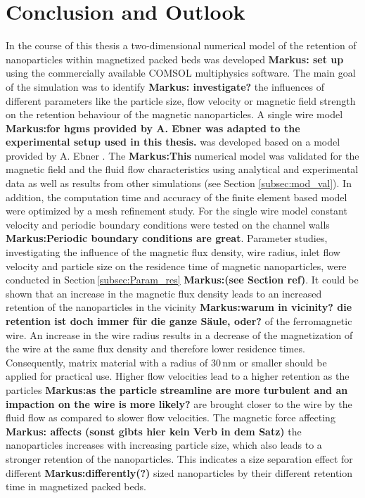 
\chapter{Conclusion and Outlook}
\label{ch:Conclusion}

In the course of this thesis a two-dimensional numerical model of the retention of nanoparticles within magnetized packed beds was developed \textbf{Markus: set up} using the commercially available COMSOL multiphysics software. The main goal of the simulation was to identify \textbf{Markus: investigate?} the influences of different parameters like the particle size, flow velocity or magnetic field strength on the retention behaviour of the magnetic nanoparticles. 
A single wire model \textbf{Markus:for hgms provided by A. Ebner was adapted to the experimental setup used in this thesis.} was developed based on a model provided by A. Ebner \cite{choomphon2017simulation}.  The \textbf{Markus:This} numerical model was validated for the magnetic field and the fluid flow characteristics using analytical and experimental data as well as results from other simulations (see Section \ref{subsec:mod_val}). In addition, the computation time and accuracy of the finite element based model were optimized by a mesh refinement study. For the single wire model constant velocity and periodic boundary conditions were tested on the channel walls \textbf{Markus:Periodic boundary conditions are great}. Parameter studies, investigating the influence of the magnetic flux density, wire radius, inlet flow velocity and particle size on the residence time of magnetic nanoparticles, were conducted in Section\,\ref{subsec:Param_res} \textbf{Markus:(see Section ref)}. It could be shown that an increase in the magnetic flux density leads to an increased retention of the nanoparticles in the vicinity \textbf{Markus:warum in vicinity? die retention ist doch immer für die ganze Säule, oder?} of the ferromagnetic wire. An increase in the wire radius results in a decrease of the magnetization of the wire at the same flux density and therefore lower residence times. Consequently, matrix material with a radius of 30\,nm or smaller should be applied for practical use. Higher flow velocities lead to a higher retention as the particles \textbf{Markus:as the particle streamline are more turbulent and an impaction on the wire is more likely?} are brought closer to the wire by the fluid flow as compared to slower flow velocities. The magnetic force affecting \textbf{Markus: affects (sonst gibts hier kein Verb in dem Satz)} the nanoparticles increases with increasing particle size, which also leads to a stronger retention of the nanoparticles. This indicates a size separation effect for different \textbf{Markus:differently(?)} sized nanoparticles by their different retention time in magnetized packed beds.


